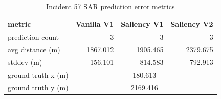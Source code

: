 \begin{table}[ht]
\centering
\caption{Incident 57 SAR prediction error metrics}
\label{tab:sar-incident-57}
\begin{tabular}{lrrr}
\hline
metric & Vanilla V1 & Saliency V1 & Saliency V2 \\
\hline
prediction count & 3 & 3 & 3 \\
avg distance (m) & 1867.012 & 1905.465 & 2379.675 \\
stddev (m) & 156.101 & 814.583 & 792.913 \\
ground truth x (m) & \multicolumn{3}{c}{180.613} \\
ground truth y (m) & \multicolumn{3}{c}{2169.416} \\
\hline
\end{tabular}
\end{table}
